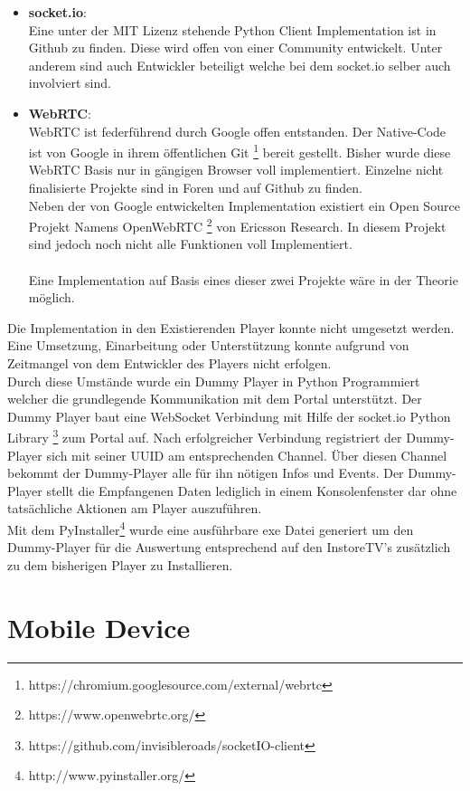 \begin{itemize}
\item \textbf{socket.io}: \\
Eine unter der MIT Lizenz stehende Python Client Implementation ist in Github zu finden. Diese wird offen von einer Community entwickelt. Unter anderem sind auch Entwickler beteiligt welche bei dem socket.io selber auch involviert sind.
\item \textbf{WebRTC}: \\
WebRTC ist federführend durch Google offen entstanden. Der Native-Code ist von Google in ihrem öffentlichen Git \footnote{https://chromium.googlesource.com/external/webrtc} bereit gestellt. Bisher wurde diese WebRTC Basis nur in gängigen Browser voll implementiert. Einzelne nicht finalisierte Projekte sind in Foren und auf Github zu finden.
\\Neben der von Google entwickelten Implementation existiert ein Open Source Projekt Namens OpenWebRTC \footnote{https://www.openwebrtc.org/} von Ericsson Research. In diesem Projekt sind jedoch noch nicht alle Funktionen voll Implementiert. \\\\Eine Implementation auf Basis eines dieser zwei Projekte wäre in der Theorie möglich.
\end{itemize} 
Die Implementation in den Existierenden Player konnte nicht umgesetzt werden. Eine Umsetzung, Einarbeitung oder Unterstützung konnte aufgrund von Zeitmangel von dem Entwickler des Players nicht erfolgen. \\Durch diese Umstände wurde ein Dummy Player in Python Programmiert welcher die grundlegende Kommunikation mit dem Portal unterstützt. Der Dummy Player baut eine WebSocket Verbindung mit Hilfe der socket.io Python Library \footnote{https://github.com/invisibleroads/socketIO-client} zum Portal auf. Nach erfolgreicher Verbindung registriert der Dummy-Player sich mit seiner UUID am entsprechenden Channel. Über diesen Channel bekommt der Dummy-Player alle für ihn nötigen Infos und Events. Der Dummy-Player stellt die Empfangenen Daten lediglich in einem Konsolenfenster dar ohne tatsächliche Aktionen am Player auszuführen. \\Mit dem PyInstaller\footnote{http://www.pyinstaller.org/} wurde eine ausführbare exe Datei generiert um den Dummy-Player für die Auswertung entsprechend auf den InstoreTV's zusätzlich zu dem bisherigen Player zu Installieren.

\section{Mobile Device}
\label{sec:In Mobile Device}





